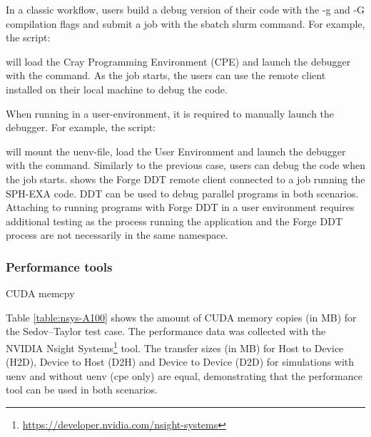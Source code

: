 In a classic workflow, users build a debug version of their code with the -g and -G compilation flags and submit a job with the sbatch slurm command.
For example, the  script:
%

%
will load the Cray Programming Environment (CPE) and launch the debugger with the  command.
As the job starts, the users can use the remote client installed on their local machine to debug the code.

When running in a user-environment, it is required to manually launch the debugger.
For example, the  script:
%

%
will mount the uenv-file, load the User Environment and launch the debugger with the  command.
Similarly to the previous case, users can debug the code when the job starts.
 shows the Forge DDT remote client connected to a job running the SPH-EXA code.
DDT can be used to debug parallel programs in both scenarios.
Attaching to running programs with Forge DDT in a user environment requires additional testing as the process running the application and the Forge DDT process are not necessarily in the same namespace.

\subsubsection{Performance tools}

\begin{table}[htp!]
    \centering
    \caption{CUDA memcpy}
    \label{table:nsys-A100}
\end{table}

Table \ref{table:nsys-A100} shows the amount of CUDA memory copies (in MB) for the Sedov--Taylor test case.
The performance data was collected with the NVIDIA {Nsight Systems\footnote{\url{https://developer.nvidia.com/nsight-systems}}}  tool.
The transfer sizes (in MB) for Host to Device (H2D), Device to Host (D2H) and Device to Device (D2D) for simulations with uenv and without uenv (cpe only) are equal, demonstrating that the performance tool can be used in both scenarios.

